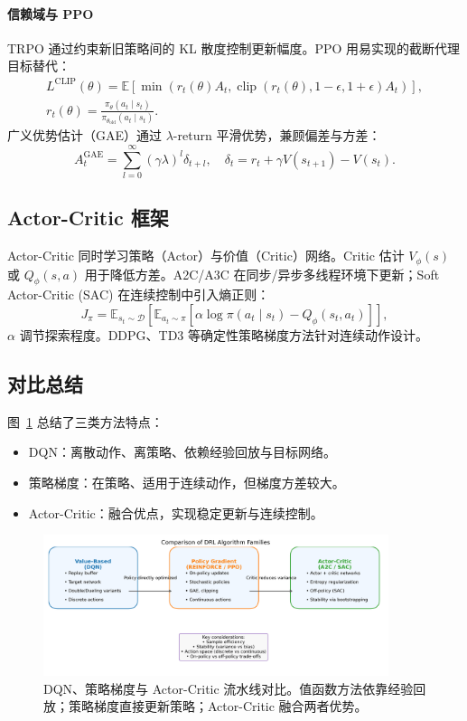 \documentclass[UTF8,zihao=-4]{ctexart}
\begin{document}
\paragraph{信赖域与 PPO}
TRPO 通过约束新旧策略间的 KL 散度控制更新幅度。PPO 用易实现的截断代理目标替代：
\begin{align}
  L^{\text{CLIP}}(\theta) = \mathbb{E}\left[ \min\left( r_t(\theta) A_t, \operatorname{clip}(r_t(\theta), 1 - \epsilon, 1 + \epsilon) A_t \right) \right], \\
  r_t(\theta) = \frac{\pi_{\theta}(a_t \mid s_t)}{\pi_{\theta_{\text{old}}}(a_t \mid s_t)}.
\end{align}
广义优势估计（GAE）通过 $\lambda$-return 平滑优势，兼顾偏差与方差：
\begin{equation}
  A_t^{\text{GAE}} = \sum_{l=0}^{\infty} (\gamma \lambda)^l \delta_{t+l}, \quad \delta_t = r_t + \gamma V(s_{t+1}) - V(s_t).
\end{equation}

\subsection{Actor-Critic 框架}
Actor-Critic 同时学习策略（Actor）与价值（Critic）网络。Critic 估计 $V_{\phi}(s)$ 或 $Q_{\phi}(s, a)$ 用于降低方差。A2C/A3C 在同步/异步多线程环境下更新；Soft Actor-Critic (SAC) 在连续控制中引入熵正则：
\begin{equation}
  J_{\pi} = \mathbb{E}_{s_t \sim \mathcal{D}} \left[ \mathbb{E}_{a_t \sim \pi} \left[\alpha \log \pi(a_t \mid s_t) - Q_{\phi}(s_t, a_t)\right] \right],
\end{equation}
$\alpha$ 调节探索程度。DDPG、TD3 等确定性策略梯度方法针对连续动作设计。

\subsection{对比总结}
图~\ref{fig:rl_overview_cn} 总结了三类方法特点：
\begin{itemize}
  \item DQN：离散动作、离策略、依赖经验回放与目标网络。
  \item 策略梯度：在策略、适用于连续动作，但梯度方差较大。
  \item Actor-Critic：融合优点，实现稳定更新与连续控制。
\end{itemize}

\begin{figure}[H]
  \centering
  \includegraphics[width=0.9\textwidth]{rl_overview.png}
  \caption{DQN、策略梯度与 Actor-Critic 流水线对比。值函数方法依靠经验回放；策略梯度直接更新策略；Actor-Critic 融合两者优势。}
  \label{fig:rl_overview_cn}
\end{figure}
\FloatBarrier
\end{document}
